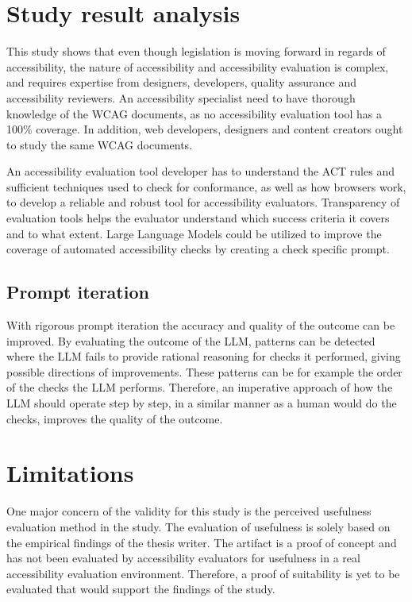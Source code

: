 \section{Study result analysis}

This study shows that even though legislation is moving forward in regards of accessibility, the nature of accessibility and accessibility evaluation is complex, and requires expertise from designers, developers, quality assurance and accessibility reviewers. An accessibility specialist need to have thorough knowledge of the WCAG documents, as no accessibility evaluation tool has a 100\% coverage. In addition, web developers, designers and content creators ought to study the same WCAG documents. 

An accessibility evaluation tool developer has to understand the ACT rules and sufficient techniques used to check for conformance, as well as how browsers work, to develop a reliable and robust tool for accessibility evaluators. Transparency of evaluation tools helps the evaluator understand which success criteria it covers and to what extent. Large Language Models could be utilized to improve the coverage of automated accessibility checks by creating a check specific prompt.

\subsection{Prompt iteration}

With rigorous prompt iteration the accuracy and quality of the outcome can be improved. By evaluating the outcome of the LLM, patterns can be detected where the LLM fails to provide rational reasoning for checks it performed, giving possible directions of improvements. These patterns can be for example the order of the checks the LLM performs. Therefore, an imperative approach of how the LLM should operate step by step, in a similar manner as a human would do the checks, improves the quality of the outcome. 


\section{Limitations}

One major concern of the validity for this study is the perceived usefulness evaluation method in the study. The evaluation of usefulness is solely based on the empirical findings of the thesis writer. The artifact is a proof of concept and has not been evaluated by accessibility evaluators for usefulness in a real accessibility evaluation environment. Therefore, a proof of suitability is yet to be evaluated that would support the findings of the study.

